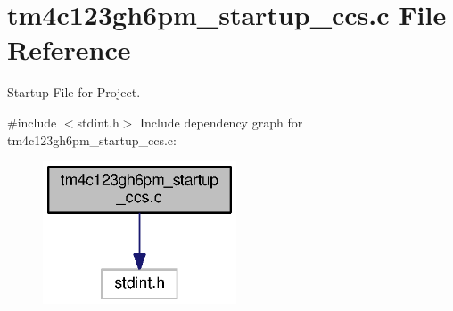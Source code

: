 \section{tm4c123gh6pm\+\_\+startup\+\_\+ccs.\+c File Reference}
\label{tm4c123gh6pm__startup__ccs_8c}


Startup File for Project.  


{\ttfamily \#include $<$stdint.\+h$>$}\newline
Include dependency graph for tm4c123gh6pm\+\_\+startup\+\_\+ccs.\+c\+:\nopagebreak
\begin{figure}[H]
\begin{center}
\leavevmode
\includegraphics[width=163pt]{tm4c123gh6pm__startup__ccs_8c__incl}
\end{center}
\end{figure}
